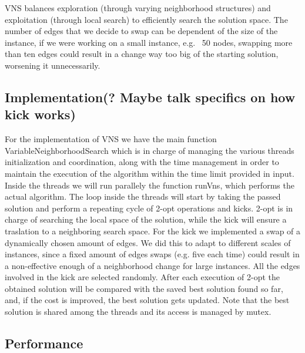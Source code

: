 VNS balances exploration (through varying neighborhood structures) and exploitation (through local search) to efficiently search the solution space.
The number of edges that we decide to swap can be dependent of the size of the instance, if we were working on a small instance, e.g. 
~50 nodes, swapping more than ten edges could result in a change way too big of the starting solution, worsening it unnecessarily.

\subsection{Implementation(? Maybe talk specifics on how kick works)}
For the implementation of VNS we have the main function VariableNeighborhoodSearch which is in charge of managing the various threads initialization 
and coordination, along with the time management in order to maintain the execution of the algorithm within the time limit provided in input.
Inside the threads we will run parallely the function runVns, which performs the actual algorithm.
The loop inside the threads will start by taking the passed solution and perform a repeating cycle of 2-opt operations and kicks. 2-opt is in charge 
of searching the local space of the solution, while the kick will ensure a traslation to a neighboring search space.
For the kick we implemented a swap of a dynamically chosen amount of edges. We did this to adapt to different scales of instances, since a fixed 
amount of edges swaps (e.g. five each time) could result in a non-effective enough of a neighborhood change for large instances. All the edges involved in the kick are selected randomly.
After each execution of 2-opt the obtained solution will be compared with the saved best solution found so far, and, if the cost is improved, the 
best solution gets updated. Note that the best solution is shared among the threads and its access is managed by mutex.

\subsection{Performance}

